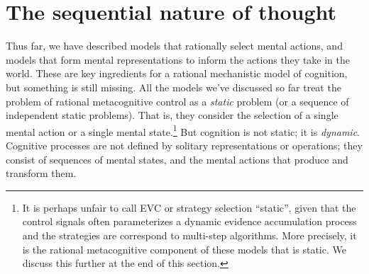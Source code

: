 


\section{The sequential nature of thought}\label{sec:intro-sequential}

Thus far, we have described models that rationally select mental actions, and models that form mental representations to inform the actions they take in the world. These are key ingredients for a rational mechanistic model of cognition, but something is still missing. All the models we've discussed so far treat the problem of rational metacognitive control as a \emph{static} problem (or a sequence of independent static problems). That is, they consider the selection of a single mental action or a single mental state.\footnote{%
  It is perhaps unfair to call EVC or strategy selection ``static'', given that the control signals often parameterizes a dynamic evidence accumulation process and the strategies are correspond to multi-step algorithms. More precisely, it is the rational metacognitive component of these models that is static. We discuss this further at the end of this section.
} But cognition is not static; it is \emph{dynamic}. Cognitive processes are not defined by solitary representations or operations; they consist of sequences of mental states, and the mental actions that produce and transform them.

